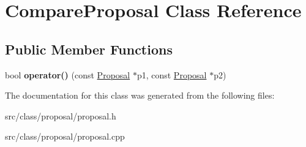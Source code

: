 \hypertarget{class_compare_proposal}{}\section{Compare\+Proposal Class Reference}
\label{class_compare_proposal}
\subsection*{Public Member Functions}
\begin{DoxyCompactItemize}
\item 
\hypertarget{class_compare_proposal_a1f358bedd3d2affcb3f5b06ac7b08732}{}bool {\bfseries operator()} (const \hyperlink{class_proposal}{Proposal} $\ast$p1, const \hyperlink{class_proposal}{Proposal} $\ast$p2)\label{class_compare_proposal_a1f358bedd3d2affcb3f5b06ac7b08732}

\end{DoxyCompactItemize}


The documentation for this class was generated from the following files\+:\begin{DoxyCompactItemize}
\item 
src/class/proposal/proposal.\+h\item 
src/class/proposal/proposal.\+cpp\end{DoxyCompactItemize}
